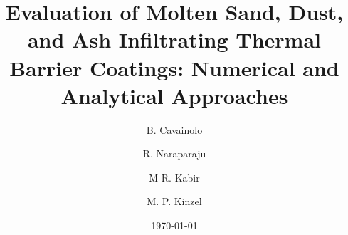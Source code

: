 \documentclass[%
 aip,
 amsmath,amssymb,
 reprint,%
]{revtex4-1}
\begin{document}

\title[Evaluation of Molten Sand, Dust, and Ash Infiltrating Thermal Barrier Coatings: Numerical and Analytical Approaches]{Evaluation of Molten Sand, Dust, and Ash Infiltrating Thermal Barrier Coatings: Numerical and Analytical Approaches}
\author{B. Cavainolo}

\author{R. Naraparaju}%
%
\author{M-R. Kabir}%
%

\author{M. P. Kinzel}


\date{\today}%
\end{document}

